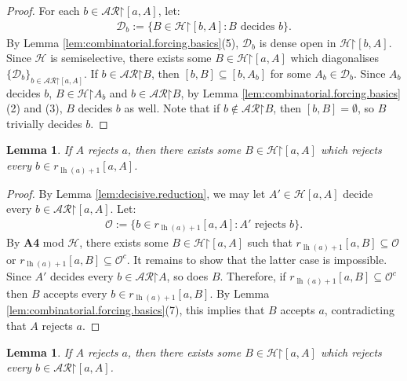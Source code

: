 \documentclass[11pt,reqno]{amsart}
\theoremstyle{plain}
\numberwithin{equation}{section}
\newtheorem{lemma}[theorem]{Lemma}
\theoremstyle{definition}
\newcommand{\func}{\operatorname}
\newcommand{\cal}{\mathcal}
\newcommand{\restrictedto}{\mathord{\upharpoonright}}
\renewcommand{\H}{\cal{H}}
\newcommand{\lh}{\func{lh}}
\renewcommand{\O}{\cal{O}}
\newcommand{\D}{\cal{D}}
\begin{document}
\begin{proof}
     For each $b \in \cal{AR}\restrictedto[a,A]$, let:
     \begin{align*}
        \D_b := \{B \in \H\restrictedto[b,A] : B \text{ decides } b\}.
     \end{align*}
     By Lemma \ref{lem:combinatorial.forcing.basics}(5), $\D_b$ is dense open in $\H\restrictedto[b,A]$. Since $\H$ is semiselective, there exists some $B \in \H\restrictedto[a,A]$ which diagonalises $\{\D_b\}_{b\in\cal{AR}\restrictedto[a,A]}$. If $b \in \cal{AR}\restrictedto B$, then $[b,B] \subseteq [b,A_b]$ for some $A_b \in \D_b$. Since $A_b$ decides $b$, $B \in \H\restrictedto A_b$ and $b \in \cal{AR}\restrictedto B$, by Lemma \ref{lem:combinatorial.forcing.basics}(2) and (3), $B$ decides $b$ as well. Note that if $b \notin \cal{AR}\restrictedto B$, then $[b,B] = \emptyset$, so $B$ trivially decides $b$.
\end{proof}

\begin{lemma}
\label{lem:one-point.reject.reduction}
    If $A$ rejects $a$, then there exists some $B \in \H\restrictedto[a,A]$ which rejects every $b \in r_{\lh(a)+1}[a,A]$.
\end{lemma}

\begin{proof}
    By Lemma \ref{lem:decisive.reduction}, we may let $A' \in \H[a,A]$ decide every $b \in \cal{AR}\restrictedto[a,A]$. Let:
    \begin{align*}
        \O := \{b \in r_{\lh(a)+1}[a,A] : A' \text{ rejects } b\}.
    \end{align*}
    By \textbf{A4} mod $\H$, there exists some $B \in \H\restrictedto[a,A]$ such that $r_{\lh(a)+1}[a,B] \subseteq \O$ or $r_{\lh(a)+1}[a,B] \subseteq \O^c$. It remains to show that the latter case is impossible. Since $A'$ decides every $b \in \cal{AR}\restrictedto A$, so does $B$. Therefore, if $r_{\lh(a)+1}[a,B] \subseteq \O^c$ then $B$ accepts every $b \in r_{\lh(a)+1}[a,B]$. By Lemma \ref{lem:combinatorial.forcing.basics}(7), this implies that $B$ accepts $a$, contradicting that $A$ rejects $a$.
\end{proof}

\begin{lemma}
\label{lem:completely.reject.reduction}
    If $A$ rejects $a$, then there exists some $B \in \H\restrictedto[a,A]$ which rejects every $b \in \cal{AR}\restrictedto[a,A]$. 
\end{lemma}
\end{document}
